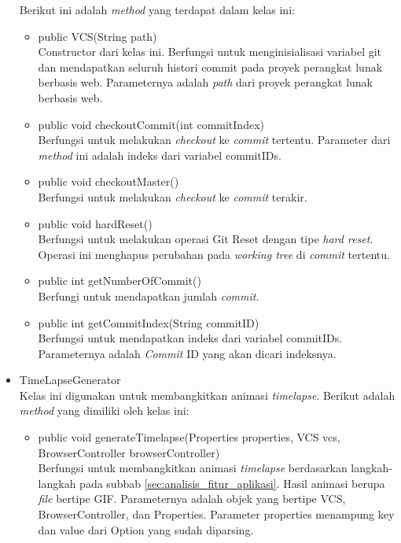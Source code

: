 \begin{itemize}
Berikut ini adalah \textit{method} yang terdapat dalam kelas ini:
\begin{itemize}
\item public VCS(String path)\\
Constructor dari kelas ini. Berfungsi untuk menginisialisasi variabel git dan mendapatkan seluruh histori commit pada proyek perangkat lunak berbasis web. Parameternya adalah \textit{path} dari proyek perangkat lunak berbasis web.
\item public void checkoutCommit(int commitIndex)\\
Berfungsi untuk melakukan \textit{checkout} ke \textit{commit} tertentu. Parameter dari \textit{method} ini adalah indeks dari variabel commitIDs.
\item public void checkoutMaster()\\
Berfungsi untuk melakukan \textit{checkout} ke \textit{commit} terakir.
\item public void hardReset()\\
Berfungsi untuk melakukan operasi Git Reset dengan tipe \textit{hard reset}. Operasi ini menghapus perubahan pada \textit{working tree} di \textit{commit} tertentu. 
\item public int getNumberOfCommit()\\
Berfungi untuk mendapatkan jumlah \textit{commit}.
\item public int getCommitIndex(String commitID)\\
Berfungsi untuk mendapatkan indeks dari variabel commitIDs. Parameternya adalah \textit{Commit} ID yang akan dicari indeksnya.
\end{itemize}


\item TimeLapseGenerator\\
Kelas ini digunakan untuk membangkitkan animasi \textit{timelapse}.
Berikut adalah \textit{method} yang dimiliki oleh kelas ini:
\begin{itemize}
\item public void generateTimelapse(Properties properties, VCS vcs, BrowserController browserController)\\
Berfungsi untuk membangkitkan animasi \textit{timelapse} berdasarkan langkah-langkah pada subbab \ref{sec:analisis_fitur_aplikasi}. Hasil animasi berupa \textit{file} bertipe GIF. Parameternya adalah objek yang bertipe VCS, BrowserController, dan Properties. Parameter properties menampung key dan value dari Option yang sudah diparsing. 
\end{itemize}

\end{itemize}

